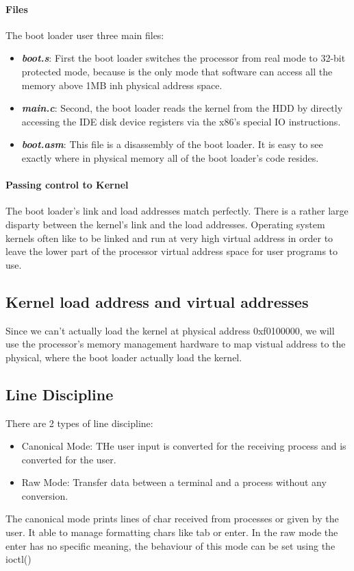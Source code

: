 \documentclass[12pt]{article}
\begin{document}
\paragraph{Files} The boot loader user three main files:
\begin{itemize}
  \item \textit{\textbf{boot.s}}: First the boot loader switches the processor from real mode to 32-bit protected mode, because is the only mode that software can access all the memory above 1MB inh physical address space.
  \item \textit{\textbf{main.c}}: Second, the boot loader reads the kernel from the HDD by directly accessing the IDE disk device registers via the x86's special I\/O instructions.
  \item \textit{\textbf{boot.asm}}: This file is a disassembly of the boot loader. It is easy to see exactly where in physical memory all of the boot loader's code resides.
\end{itemize}
\paragraph{Passing control to Kernel} The boot loader's link and load addresses match perfectly. There is a rather large disparty between the kernel's link and the load addresses. Operating system kernels often like to be linked and run at very high virtual address in order to leave the lower part of the processor virtual address space for user programs to use.

\subsection{Kernel load address and virtual addresses}
Since we can't actually load the kernel at physical address 0xf0100000, we will use the processor's memory management hardware to map vistual address to the physical, where the boot loader actually load the kernel.

\subsection{Line Discipline}
There are 2 types of line discipline:
\begin{itemize}
  \item Canonical Mode: THe user input is converted for the receiving process and is converted for the user.
  \item Raw Mode: Transfer data between a terminal and a process without any conversion.
\end{itemize}
The canonical mode prints lines of char received from processes or given by the user. It able to manage formatting chars like tab or enter. In the raw mode the enter has no specific meaning, the behaviour of this mode can be set using the ioctl()
\end{document}

